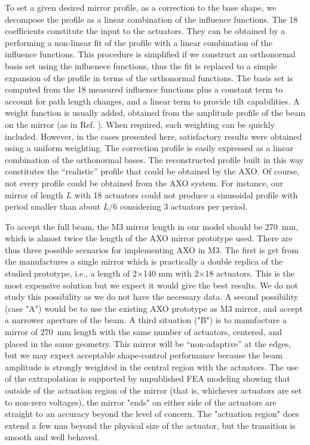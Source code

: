 \documentclass{iucr}
\newcommand{\inblue}[1]{{\color{black}#1}}
\begin{document}
To set a given desired mirror profile, as a correction to the base shape, we decompose the profile as a linear combination of the influence functions. The 18 coefficients constitute the input to the actuators. \inblue{They can be obtained by a performing a non-linear fit of the profile with a linear combination of the influence functions. This procedure is simplified if we construct an orthonormal basis set using the influenece functions, thus the fit is replaced to a simple expansion of the profile in terms of the orthonormal functions.}
The basis \inblue{set} is computed from the 18 measured influence functions plus a constant term to account for path length changes, and a linear term to provide tilt capabilities.
\inblue{A weight function is usually added, obtained from the amplitude profile of the beam on the mirror (as in Ref. \cite{Goldberg2016}). When required, such weighting can be quickly included. However, in the cases presented here, satisfactory results were obtained using a uniform weighting.}
The correction profile is easily expressed as a linear combination of the orthonormal bases. The reconstructed profile built in this way constitutes the ``realistic'' profile that could be obtained by the AXO. Of course, not every profile could be obtained from the AXO system. For instance, our mirror of length $L$ with 18 actuators could not produce a sinusoidal profile with period smaller than about $L/6$ considering 3 actuators per period.

To accept the full beam, the M3 mirror length in our model should be 270~mm, which is almost twice the length of the AXO mirror prototype used. There are thus three possible scenarios for implementing AXO in M3. The first is get from the manufactures a single mirror which is practically a double replica of the studied prototype, i.e., a length of 2$\times$140 mm with 2$\times$18 actuators. This is the most expensive solution but we expect it would give the best results. We do not study this possibility as we do not have the necessary data. \inblue{A second possibility (case "A") would be to use the existing AXO prototype as M3 mirror, and accept a narrower aperture of the beam. A third situation ("B") is to manufacture a mirror of 270~mm length with the same number of actuators, centered, and placed in the same geometry. This mirror will be ``non-adaptive'' at the edges, but we may expect acceptable shape-control performance because the beam amplitude is strongly weighted in the central region with the actuators.
The use of the extrapolation is supported by unpublished FEA modeling showing that outside of the actuation region of the mirror (that is, whichever actuators are set to non-zero voltages), the mirror "ends" on either side of the actuators are straight to an accuracy beyond the level of concern. The "actuation region" does extend a few mm beyond the physical size of the actuator, but the transition is smooth and well behaved.
}
\end{document}
